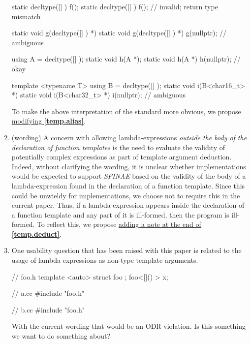 \documentclass{wg21}
\begin{document}
\begin{enumerate}
\begin{cpp}
static decltype([] { }) f();
static decltype([] { }) f(); // invalid; return type mismatch

static void g(decltype([] { }) *) { }
static void g(decltype([] { }) *) { }
g(nullptr); // ambiguous

using A = decltype([] { });
static void h(A *);
static void h(A *) { }
h(nullptr); // okay

template <typename T>
using B = decltype([] { });
static void i(B<char16_t> *) { }
static void i(B<char32_t> *) { }
i(nullptr); // ambiguous
\end{cpp}

    To make the above interpretation of the standard more obvious, we propose
    \hyperref[wording.redeclarations]{modifying \textbf{[temp.alias]}}.


  \item \label{discussion.sfinae}
    \hyperref[wording.sfinae]{(wording)}
    A concern with allowing lambda-expressions \textit{outside the body of
    the declaration of function templates} is the need to evaluate the validity
    of potentially complex expressions as part of template argument deduction.
    Indeed, without clarifying the wording, it is unclear whether implementations
    would be expected to support \textit{SFINAE} based on the validity of
    the body of a lambda-expression found in the declaration of a function
    template. Since this could be unwieldy for implementations, we choose not
    to require this in the current paper. Thus, if a lambda-expression appears
    inside the declaration of a function template and any part of it is ill-formed,
    then the program is ill-formed. To reflect this, we propose
    \hyperref[wording.sfinae]{adding a note at the end of \textbf{[temp.deduct]}}.

  \item \label{discussion.nontype}
    One usability question that has been raised with this paper is related
    to the usage of lambda expressions as non-type template arguments.

\begin{cpp}
// foo.h
template <auto> struct foo { };
foo<[]() {}> x;

// a.cc
#include "foo.h"

// b.cc
#include "foo.h"
\end{cpp}

    With the current wording that would be an ODR violation. Is this something
    we want to do something about?

\end{enumerate}
\end{document}
